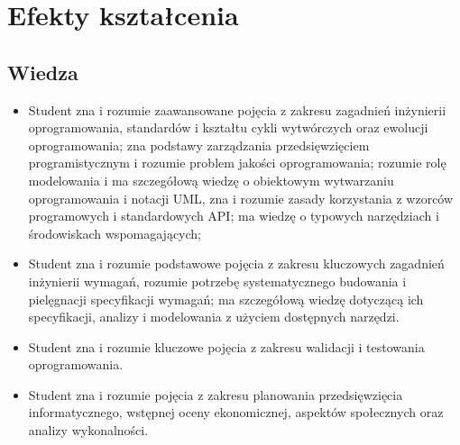 \documentclass[12pt, a4paper]{article}
\begin{document}
\section{Efekty kształcenia}

\subsection*{Wiedza}
\begin{itemize}
  \item Student zna i rozumie zaawansowane pojęcia z zakresu zagadnień inżynierii oprogramowania, standardów i kształtu cykli wytwórczych oraz ewolucji oprogramowania; zna podstawy zarządzania przedsięwzięciem programistycznym i rozumie problem jakości oprogramowania; rozumie rolę modelowania i ma szczegółową wiedzę o obiektowym wytwarzaniu oprogramowania i notacji UML, zna i rozumie zasady korzystania z wzorców programowych i standardowych API; ma wiedzę o typowych narzędziach i środowiskach wspomagających;
  \item Student zna i rozumie podstawowe pojęcia z zakresu kluczowych zagadnień inżynierii wymagań, rozumie potrzebę systematycznego budowania i pielęgnacji specyfikacji wymagań; ma szczegółową wiedzę dotyczącą ich specyfikacji, analizy i modelowania z użyciem dostępnych narzędzi.
  \item Student zna i rozumie kluczowe pojęcia z zakresu walidacji i testowania oprogramowania.
  \item Student zna i rozumie pojęcia z zakresu planowania przedsięwzięcia informatycznego, wstępnej oceny ekonomicznej, aspektów społecznych oraz analizy wykonalności.
\end{itemize}
\end{document}
